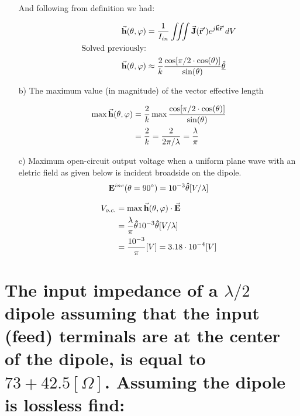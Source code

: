 \documentclass[12pt, letterpaper]{article}
\begin{document}
\begin{itemize}
  And following from definition we had:

  \begin{align*}
    \va{h}(\theta,\varphi)
    &=
    {1\over I_{in}}
    \iiint
    \va{J}(\va{r}')
    e^{j\va{k}\va{r}'}
    dV
    \\
    \text{Solved previously:}
    \\
    \va{h}(\theta,\varphi)
    &\approx
    {2\over k}
    {
      \cos[\pi/2\cdot\cos(\theta)]
      \over
      \sin(\theta)
    }
    \underline{\hat{\vb{\theta}}}
  \end{align*}


  \item [b)] The maximum value (in magnitude) of the vector effective length

  \begin{align*}
    \max{\va{h}(\theta,\varphi)}
    &=
    {2\over k}
    \max{
      \cos[\pi/2\cdot\cos(\theta)]
      \over
      \sin(\theta)
    }
    \\
    &=
    {2\over k}
    =
    {2\over 2\pi/\lambda}
    =
    {\lambda\over\pi}
  \end{align*}

  \item [c)] Maximum open-circuit output voltage when a uniform plane wave with an eletric field as given below is incident broadside on the dipole.
  \begin{align*}
    \vb{E}^{inc}(\theta=90^{\circ}) = 10^{-3}\vu{\theta}[V/\lambda]
  \end{align*}

  \begin{align*}
    V_{o.c.}
    &=
    \max{\va{h}(\theta,\varphi)\cdot \va{E}}
    \\
    &=
    {\lambda\over\pi}
    \vu{\theta}
    10^{-3}
    \vu{\theta}
    [V/\lambda]
    \\
    &=
    {10^{-3}\over\pi}
    [V]
    =
    3.18\cdot10^{-4}[V]
  \end{align*}
\end{itemize}

\section{The input impedance of a $\lambda/2$ dipole assuming that the input (feed) terminals are at the center of the dipole, is equal to $73+42.5 [\Omega]$. Assuming the dipole is lossless find:}
\end{document}
